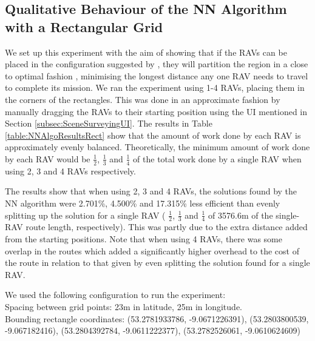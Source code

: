\pagebreak
\subsection{Qualitative Behaviour of the NN Algorithm with a Rectangular Grid}
We set up this experiment with the aim of showing that if the RAVs can be placed in the configuration suggested by \citeauthor{Hungerlander2018TheGrids}, they will partition the region in a close to optimal fashion \cite{Hungerlander2018TheGrids}, minimising the longest distance any one RAV needs to travel to complete its mission. We ran the experiment using 1-4 RAVs, placing them in the corners of the rectangles. This was done in an approximate fashion by manually dragging the RAVs to their starting position using the UI mentioned in Section \ref{subsec:SceneSurveyingUI}. The results in Table \ref{table:NNAlgoResultsRect} show that the amount of work done by each RAV is approximately evenly balanced. Theoretically, the minimum amount of work done by each RAV would be $\frac{1}{2}$, $\frac{1}{3}$ and $\frac{1}{4}$ of the total work done by a single RAV when using 2, 3 and 4 RAVs respectively.
\par The results show that when using 2, 3 and 4 RAVs, the solutions found by the NN algorithm were 2.701\%, 4.500\% and 17.315\% less efficient than evenly splitting up the solution for a single RAV ( $\frac{1}{2}$, $\frac{1}{3}$ and $\frac{1}{4}$ of 3576.6m of the single-RAV route length, respectively). This was partly due to the extra distance added from the starting positions. Note that when using 4 RAVs, there was some overlap in the routes which added a significantly higher overhead to the cost of the route in relation to that given by even splitting the solution found for a single RAV.


We used the following configuration to run the experiment:
\\Spacing between grid points: 23m in latitude, 25m in longitude.
\\Bounding rectangle coordinates: (53.2781933786, -9.0671226391), (53.2803800539, -9.067182416), (53.2804392784, -9.0611222377), (53.2782526061, -9.0610624609)
\\

